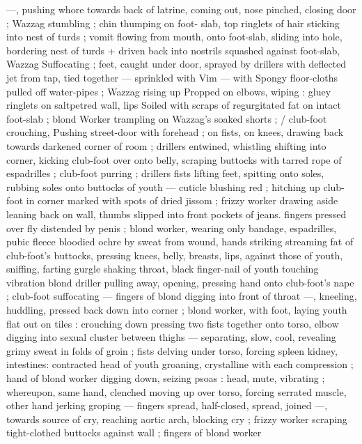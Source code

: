 ---, pushing whore towards back of latrine, coming out, nose 
pinched, closing door ; Wazzag stumbling ; chin thumping on foot- 
slab, top ringlets of hair sticking into nest of turds ; vomit flowing 
from mouth, onto foot-slab, sliding into hole, bordering nest of turds 
+ driven back into nostrils squashed against foot-slab, Wazzag 
Suffocating ; feet, caught under door, sprayed by drillers with 
deflected jet from tap, tied together --- sprinkled with Vim --- with 
Spongy floor-cloths pulled off water-pipes ; Wazzag rising up 
Propped on elbows, wiping : gluey ringlets on saltpetred wall, lips 
Soiled with scraps of regurgitated fat on intact foot-slab ; blond 
Worker trampling on Wazzag's soaked shorts ; {\slash} club-foot crouching, 
Pushing street-door with forehead ; on fists, on knees, drawing back 
towards darkened corner of room ; drillers entwined, whistling 
shifting into corner, kicking club-foot over onto belly, scraping 
buttocks with tarred rope of espadrilles ; club-foot purring ; drillers 
fists lifting feet, spitting onto soles, rubbing soles onto buttocks of 
youth --- cuticle blushing red ; hitching up club-foot in corner 
marked with spots of dried jissom ; frizzy worker drawing aside 
leaning back on wall, thumbs slipped into front pockets of jeans. 
fingers pressed over fly distended by penis ; blond worker, wearing 
only bandage, espadrilles, pubic fleece bloodied ochre by sweat from 
wound, hands striking streaming fat of club-foot's buttocks, pressing 
knees, belly, breasts, lips, against those of youth, sniffing, farting 
gurgle shaking throat, black finger-nail of youth touching vibration 
blond driller pulling away, opening, pressing hand onto club-foot's 
nape ; club-foot suffocating --- fingers of blond digging into front of 
throat ---, kneeling, huddling, pressed back down into corner ; blond 
worker, with foot, laying youth flat out on tiles : crouching down 
pressing two fists together onto torso, elbow digging into sexual 
cluster between thighs --- separating, slow, cool, revealing grimy 
sweat in folds of groin ; fists delving under torso, forcing spleen 
kidney, intestines: contracted head of youth groaning, crystalline 
with each compression ; hand of blond worker digging down, seizing 
psoas : head, mute, vibrating ; whereupon, same hand, clenched 
moving up over torso, forcing serrated muscle, other hand jerking 
groping --- fingers spread, half-closed, spread, joined ---, towards 
source of cry, reaching aortic arch, blocking cry ; frizzy worker 
scraping tight-clothed buttocks against wall ; fingers of blond worker 
